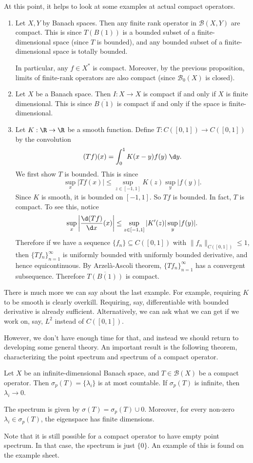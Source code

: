 \documentclass[a4paper]{article}
\begin{document}
At this point, it helps to look at some examples at actual compact operators.
\begin{eg}\leavevmode
  \begin{enumerate}
    \item Let $X, Y$ by Banach spaces. Then any finite rank operator in $\mathcal{B}(X, Y)$ are compact. This is since $T(B(1))$ is a bounded subset of a finite-dimensional space (since $T$ is bounded), and any bounded subset of a finite-dimensional space is totally bounded.

      In particular, any $f \in X^*$ is compact. Moreover, by the previous proposition, limits of finite-rank operators are also compact (since $\mathcal{B}_0(X)$ is closed).
    \item Let $X$ be a Banach space. Then $I: X \to X$ is compact if and only if $X$ is finite dimensional. This is since $\overline{B(1)}$ is compact if and only if the space is finite-dimensional.
    \item Let $K: \R \to \R$ be a smooth function. Define $T: C([0, 1]) \to C([0, 1])$ by the convolution
      \[
        (T f)(x) = \int_0^1 K(x - y) f(y)\;\d y.
      \]
      We first show $T$ is bounded. This is since
      \[
        \sup_x |T f(x)| \leq \sup_{z \in [-1, 1]} K(z) \sup_y |f(y)|.
      \]
      Since $K$ is smooth, it is bounded on $[-1, 1]$. So $Tf$ is bounded. In fact, $T$ is compact. To see this, notice
      \[
        \sup_x \left|\frac{\d (Tf)}{\d x}(x)\right| \leq \sup_{z \in [-1, 1]} |K'(z)| \sup_y |f(y)|.
      \]
      Therefore if we have a sequence $\{f_n\} \subseteq C([0, 1])$ with $\|f_n\|_{C([0, 1])} \leq 1$, then $\{T f_n\}_{n = 1}^\infty$ is uniformly bounded with uniformly bounded derivative, and hence equicontinuous. By Arzel\`a-Ascoli theorem, $\{T f_n\}_{n = 1}^\infty$ has a convergent subsequence. Therefore $\overline{T(B(1))}$ is compact.
  \end{enumerate}
\end{eg}
There is much more we can say about the last example. For example, requiring $K$ to be smooth is clearly overkill. Requiring, say, differentiable with bounded derivative is already sufficient. Alternatively, we can ask what we can get if we work on, say, $L^2$ instead of $C([0, 1])$.

However, we don't have enough time for that, and instead we should return to developing some general theory. An important result is the following theorem, characterizing the point spectrum and spectrum of a compact operator.
\begin{thm}
  Let $X$ be an infinite-dimensional Banach space, and $T \in \mathcal{B}(X)$ be a compact operator. Then $\sigma_p(T) = \{\lambda_i\}$ is at most countable. If $\sigma_p(T)$ is infinite, then $\lambda_i \to 0$.

  The spectrum is given by $\sigma(T) = \sigma_p(T) \cup 0$. Moreover, for every non-zero $\lambda_i \in \sigma_p (T)$, the eigenspace has finite dimensions.
\end{thm}
Note that it is still possible for a compact operator to have empty point spectrum. In that case, the spectrum is just $\{0\}$. An example of this is found on the example sheet.
\end{document}
